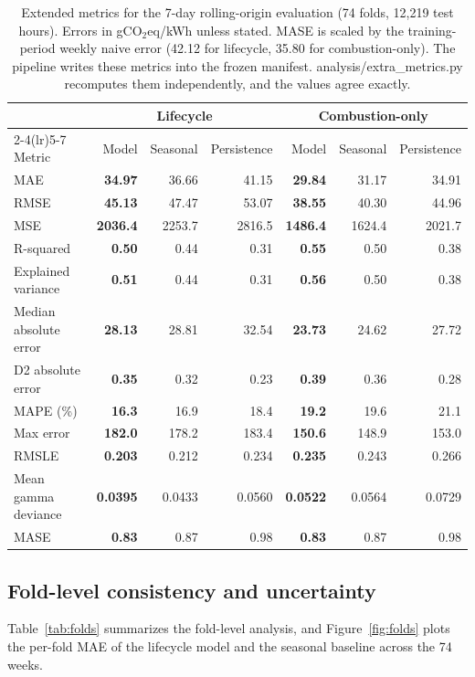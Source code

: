 \documentclass[10pt,journal,compsoc]{IEEEtran}
\begin{document}
\begin{table}[t]
\caption{Extended metrics for the 7-day rolling-origin evaluation (74 folds, 12,219 test hours). Errors in gCO$_2$eq/kWh unless stated. MASE is scaled by the training-period weekly naive error (42.12 for lifecycle, 35.80 for combustion-only). The pipeline writes these metrics into the frozen manifest. analysis/extra\_metrics.py recomputes them independently, and the values agree exactly.}
\label{tab:metrics}
\centering
\small
\begin{tabular}{@{}lrrrrrr@{}}
\toprule
 & \multicolumn{3}{c}{Lifecycle} & \multicolumn{3}{c}{Combustion-only} \\
\cmidrule(lr){2-4}\cmidrule(lr){5-7}
Metric & Model & Seasonal & Persistence & Model & Seasonal & Persistence \\
\midrule
MAE & \textbf{34.97} & 36.66 & 41.15 & \textbf{29.84} & 31.17 & 34.91 \\
RMSE & \textbf{45.13} & 47.47 & 53.07 & \textbf{38.55} & 40.30 & 44.96 \\
MSE & \textbf{2036.4} & 2253.7 & 2816.5 & \textbf{1486.4} & 1624.4 & 2021.7 \\
R-squared & \textbf{0.50} & 0.44 & 0.31 & \textbf{0.55} & 0.50 & 0.38 \\
Explained variance & \textbf{0.51} & 0.44 & 0.31 & \textbf{0.56} & 0.50 & 0.38 \\
Median absolute error & \textbf{28.13} & 28.81 & 32.54 & \textbf{23.73} & 24.62 & 27.72 \\
D2 absolute error & \textbf{0.35} & 0.32 & 0.23 & \textbf{0.39} & 0.36 & 0.28 \\
MAPE (\%) & \textbf{16.3} & 16.9 & 18.4 & \textbf{19.2} & 19.6 & 21.1 \\
Max error & \textbf{182.0} & 178.2 & 183.4 & \textbf{150.6} & 148.9 & 153.0 \\
RMSLE & \textbf{0.203} & 0.212 & 0.234 & \textbf{0.235} & 0.243 & 0.266 \\
Mean gamma deviance & \textbf{0.0395} & 0.0433 & 0.0560 & \textbf{0.0522} & 0.0564 & 0.0729 \\
MASE & \textbf{0.83} & 0.87 & 0.98 & \textbf{0.83} & 0.87 & 0.98 \\
\bottomrule
\end{tabular}
\end{table}

\subsection{Fold-level consistency and uncertainty}
Table~\ref{tab:folds} summarizes the fold-level analysis, and Figure~\ref{fig:folds} plots the per-fold MAE of the lifecycle model and the seasonal baseline across the 74 weeks.
\end{document}

